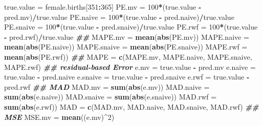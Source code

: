 \documentclass[
]{book}
\newenvironment{Shaded}{\begin{snugshade}}{\end{snugshade}}
\newcommand{\DecValTok}[1]{\textcolor[rgb]{0.00,0.00,0.81}{#1}}
\newcommand{\DocumentationTok}[1]{\textcolor[rgb]{0.56,0.35,0.01}{\textbf{\textit{#1}}}}
\newcommand{\FunctionTok}[1]{\textcolor[rgb]{0.13,0.29,0.53}{\textbf{#1}}}
\newcommand{\NormalTok}[1]{#1}
\newcommand{\OtherTok}[1]{\textcolor[rgb]{0.56,0.35,0.01}{#1}}
\newcommand{\SpecialCharTok}[1]{\textcolor[rgb]{0.81,0.36,0.00}{\textbf{#1}}}
\begin{document}
\begin{Shaded}
\begin{Highlighting}[]
\NormalTok{true.value }\OtherTok{=}\NormalTok{ female.births[}\DecValTok{351}\SpecialCharTok{:}\DecValTok{365}\NormalTok{]}
\NormalTok{PE.mv }\OtherTok{=}  \DecValTok{100}\SpecialCharTok{*}\NormalTok{(true.value }\SpecialCharTok{{-}}\NormalTok{ pred.mv)}\SpecialCharTok{/}\NormalTok{true.value}
\NormalTok{PE.naive }\OtherTok{=}  \DecValTok{100}\SpecialCharTok{*}\NormalTok{(true.value }\SpecialCharTok{{-}}\NormalTok{ pred.naive)}\SpecialCharTok{/}\NormalTok{true.value}
\NormalTok{PE.snaive }\OtherTok{=}  \DecValTok{100}\SpecialCharTok{*}\NormalTok{(true.value }\SpecialCharTok{{-}}\NormalTok{ pred.snaive)}\SpecialCharTok{/}\NormalTok{true.value}
\NormalTok{PE.rwf }\OtherTok{=}  \DecValTok{100}\SpecialCharTok{*}\NormalTok{(true.value }\SpecialCharTok{{-}}\NormalTok{ pred.rwf)}\SpecialCharTok{/}\NormalTok{true.value}
\DocumentationTok{\#\#}
\NormalTok{MAPE.mv }\OtherTok{=} \FunctionTok{mean}\NormalTok{(}\FunctionTok{abs}\NormalTok{(PE.mv))}
\NormalTok{MAPE.naive }\OtherTok{=} \FunctionTok{mean}\NormalTok{(}\FunctionTok{abs}\NormalTok{(PE.naive))}
\NormalTok{MAPE.snaive }\OtherTok{=} \FunctionTok{mean}\NormalTok{(}\FunctionTok{abs}\NormalTok{(PE.snaive))}
\NormalTok{MAPE.rwf }\OtherTok{=} \FunctionTok{mean}\NormalTok{(}\FunctionTok{abs}\NormalTok{(PE.rwf))}
\DocumentationTok{\#\#}
\NormalTok{MAPE }\OtherTok{=} \FunctionTok{c}\NormalTok{(MAPE.mv, MAPE.naive, MAPE.snaive, MAPE.rwf)}
\DocumentationTok{\#\# residual{-}based Error}
\NormalTok{e.mv }\OtherTok{=}\NormalTok{ true.value }\SpecialCharTok{{-}}\NormalTok{ pred.mv}
\NormalTok{e.naive }\OtherTok{=}\NormalTok{ true.value }\SpecialCharTok{{-}}\NormalTok{ pred.naive}
\NormalTok{e.snaive }\OtherTok{=}\NormalTok{ true.value }\SpecialCharTok{{-}}\NormalTok{ pred.snaive}
\NormalTok{e.rwf }\OtherTok{=}\NormalTok{ true.value }\SpecialCharTok{{-}}\NormalTok{ pred.rwf}
\DocumentationTok{\#\# MAD}
\NormalTok{MAD.mv }\OtherTok{=} \FunctionTok{sum}\NormalTok{(}\FunctionTok{abs}\NormalTok{(e.mv))}
\NormalTok{MAD.naive }\OtherTok{=} \FunctionTok{sum}\NormalTok{(}\FunctionTok{abs}\NormalTok{(e.naive))}
\NormalTok{MAD.snaive }\OtherTok{=} \FunctionTok{sum}\NormalTok{(}\FunctionTok{abs}\NormalTok{(e.snaive))}
\NormalTok{MAD.rwf }\OtherTok{=} \FunctionTok{sum}\NormalTok{(}\FunctionTok{abs}\NormalTok{(e.rwf))}
\NormalTok{MAD }\OtherTok{=} \FunctionTok{c}\NormalTok{(MAD.mv, MAD.naive, MAD.snaive, MAD.rwf)}
\DocumentationTok{\#\# MSE}
\NormalTok{MSE.mv }\OtherTok{=} \FunctionTok{mean}\NormalTok{((e.mv)}\SpecialCharTok{\^{}}\DecValTok{2}\NormalTok{)}

\end{Highlighting}
\end{Shaded}
\end{document}
